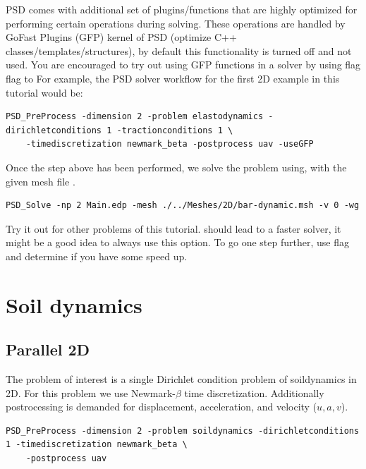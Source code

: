 {{PSD comes with additional set of plugins/functions that are highly optimized for performing certain operations during solving. These operations are handled by GoFast Plugins (GFP) kernel of PSD (optimize C++ classes/templates/structures), by default this functionality is turned off and not used. You are encouraged to try out using GFP functions in a solver by using  flag flag to  For example, the PSD solver workflow for the first 2D example in this tutorial would be:

\begin{lstlisting}[style=BashInputStyle]
	PSD_PreProcess -dimension 2 -problem elastodynamics -dirichletconditions 1 -tractionconditions 1 \
	-timediscretization newmark_beta -postprocess uav -useGFP
\end{lstlisting}

Once the step above has been performed, we solve the problem using, with the given mesh file . 

\begin{lstlisting}[style=BashInputStyle]
	PSD_Solve -np 2 Main.edp -mesh ./../Meshes/2D/bar-dynamic.msh -v 0 -wg
\end{lstlisting}

Try it out for other problems of this tutorial.  should lead to a faster solver, it might be a good idea to always use this option. To go one step further, use  flag and determine if you have some speed up.


\pagebreak

\section{Soil dynamics}

\subsection{Parallel 2D}

The problem of interest is a single Dirichlet condition problem of soildynamics in 2D. For this problem we use Newmark-$\beta$ time discretization. Additionally postrocessing is demanded for displacement, acceleration, and velocity ($u,a,v$).

\begin{lstlisting}[style=BashInputStyle]
	PSD_PreProcess -dimension 2 -problem soildynamics -dirichletconditions 1 -timediscretization newmark_beta \
	-postprocess uav
\end{lstlisting}

}}
